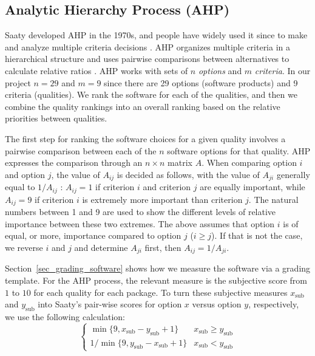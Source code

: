 \documentclass[final, 3p, times, authoryear]{elsarticle}
\begin{document}
\subsection{Analytic Hierarchy Process (AHP)} \label{sec_AHP}

Saaty developed AHP in the 1970s, and people have widely used it since to make
and analyze multiple criteria decisions \citep{VaidyaEtAl2006}. AHP organizes
multiple criteria in a hierarchical structure and uses pairwise comparisons
between alternatives to calculate relative ratios \citep{Saaty1990}. AHP works
with sets of $n$ \textit{options} and $m$ \textit{criteria}.  In our project
$n=29$ and $m=9$ since there are 29 options (software products) and 9 criteria
(qualities). We rank the software for each of the qualities, and then we combine
the quality rankings into an overall ranking based on the relative priorities
between qualities.

The first step for ranking the software choices for a given quality involves a
pairwise comparison between each of the $n$ software options for that quality.
AHP expresses the comparison through an $n \times n$ matrix $A$. When comparing
option $i$ and option $j$, the value of $A_{ij}$ is decided as follows, with the
value of $A_{ji}$ generally equal to $1/A_{ij}$ \citep{Saaty1990}: $A_{ij} = 1$
if criterion $i$ and criterion $j$ are equally important, while $A_{ij} = 9$ if
criterion $i$ is extremely more important than criterion $j$.  The natural
numbers between 1 and 9 are used to show the different levels of relative
importance between these two extremes. The above assumes that option $i$ is of
equal, or more, importance compared to option $j$ ($i \geq j$).  If that is not
the case, we reverse $i$ and $j$ and determine $A_{ji}$ first, then $A_{ij} =
1/A_{ji}$.

Section~\ref{sec_grading_software} shows how we measure the software via a
grading template.  For the AHP process, the relevant measure is the subjective
score from $1$ to $10$ for each quality for each package. To turn these
subjective measures $x_{\text{sub}}$ and $y_{\text{sub}}$ into Saaty's
pair-wise scores for option $x$ versus option $y$, respectively, we use the
following calculation:
\[
\begin{cases}
\min\{9, x_{\text{sub}} - y_{\text{sub}} + 1\} & x_{\text{sub}} \geq y_{\text{sub}} \\
1 / \min\{9, y_{\text{sub}} - x_{\text{sub}} + 1\} & x_{\text{sub}} < y_{\text{sub}}
\end{cases}
\]
\end{document}
